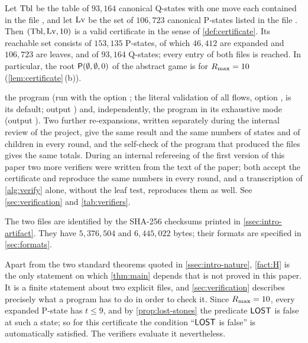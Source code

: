 \begin{fact}\label{fact:H}
Let $\mathrm{Tbl}$ be the table of $93{,}164$ canonical Q-states with one move each contained in the file
, and let $\mathrm{Lv}$ be the set of $106{,}723$ canonical P-states listed in the file
. Then $(\mathrm{Tbl},\mathrm{Lv},10)$ is a valid certificate in the sense of
\cref{def:certificate}. Its reachable set consists of $153{,}135$ P-states, of which $46{,}412$ are expanded
and $106{,}723$ are leaves, and of $93{,}164$ Q-states; every entry of both files is reached. In
particular, the root $\mathsf{P}(\emptyset,\emptyset,0)$ of the abstract game is \WON{} for $R_{\max}=10$
\textup{(\cref{lem:certificate}\,(b))}.

\established the program  (run with the option ; the literal
validation of all flows, option , is its default; output
) and, independently, the program
 in its exhaustive mode (output ). Two further
re-expansions, written separately during the internal review of the project, give the same result and the
same numbers of states and of children in every round, and the self-check of the program that produced the
files gives the same totals. During an internal refereeing of the first version of this paper two more
verifiers were written from the text of the paper; both accept the certificate and reproduce the same
numbers in every round, and a
transcription of \cref{alg:verify} alone, without the leaf test, reproduces them as well. See
\cref{sec:verification} and \cref{tab:verifiers}.
\end{fact}

The two files are identified by the SHA-256 checksums printed in \cref{ssec:intro-artifact}.
They have $5{,}376{,}504$ and $6{,}445{,}022$ bytes; their formats are specified in \cref{sec:formats}.

Apart from the two standard theorems quoted in \cref{ssec:intro-nature}, \cref{fact:H} is the only
statement on which \cref{thm:main} depends that is not proved in
this paper. It is a finite statement about two explicit files, and \cref{sec:verification} describes
precisely what a program has to do in order to check it. Since $R_{\max}=10$, every expanded P-state has
$t\le 9$, and by \cref{prop:lost-stones} the predicate $\mathsf{LOST}$ is false at such a state; so for this
certificate the condition ``$\mathsf{LOST}$ is false'' is automatically satisfied. The verifiers evaluate it
nevertheless.


